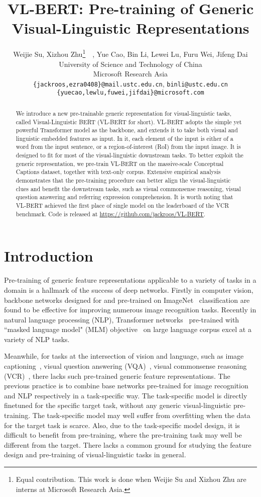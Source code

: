 \documentclass{article} \usepackage{iclr2020_conference,times}
\title{VL-BERT: Pre-training of Generic Visual-Linguistic Representations}
\author{Weijie Su, Xizhou Zhu\thanks{Equal contribution. This work is done when Weijie Su and Xizhou Zhu are interns at Microsoft Research Asia.}~~, Yue Cao, Bin Li, Lewei Lu, Furu Wei, Jifeng Dai  \\
University of Science and Technology of China
\\
Microsoft Research Asia \\
\texttt{\{jackroos,ezra0408\}@mail.ustc.edu.cn}, \texttt{binli@ustc.edu.cn} \\
\texttt{\{yuecao,lewlu,fuwei,jifdai\}@microsoft.com} \\
}
\begin{document}
\maketitle

\begin{abstract}
We introduce a new pre-trainable generic representation for visual-linguistic tasks, called Visual-Linguistic BERT (VL-BERT for short). VL-BERT adopts the simple yet powerful Transformer model as the backbone, and extends it to take both visual and linguistic embedded features as input. In it, each element of the input is either of a word from the input sentence, or a region-of-interest (RoI) from the input image. It is designed to fit for most of the visual-linguistic downstream tasks. To better exploit the generic representation, we pre-train VL-BERT on the massive-scale Conceptual Captions dataset, together with text-only corpus. Extensive empirical analysis demonstrates that the pre-training procedure can better align the visual-linguistic clues and benefit the downstream tasks, such as visual commonsense reasoning, visual question answering and referring expression comprehension. 
It is worth noting that VL-BERT achieved the first place of single model on the leaderboard of the VCR benchmark. 
Code is released at \url{https://github.com/jackroos/VL-BERT}.
\end{abstract}


\section{Introduction}
Pre-training of generic feature representations applicable to a variety of tasks in a domain is a hallmark of the success of deep networks. Firstly in computer vision, backbone networks
designed for and pre-trained on ImageNet~\citep{deng2009imagenet} classification are found to be effective for improving numerous image recognition tasks. Recently in natural language processing (NLP), Transformer networks~\citep{vaswani2017transformer} pre-trained with ``masked language model" (MLM) objective~\citep{devlin2018bert} on large language corpus excel at a variety of NLP tasks.


Meanwhile, for tasks at the intersection of vision and language, such as image captioning~\citep{young2014image,chen2015microsoft,sharma2018conceptual}, visual question answering (VQA)~\citep{antol2015vqa,johnson2017clevr,goyal2017making,hudson2019gqa}, visual commonsense reasoning (VCR)~\citep{zellers2019vcr,gao2019two}, there lacks such pre-trained generic feature representations. The previous practice is to combine base networks pre-trained for image recognition and NLP respectively in a task-specific way. The task-specific model is directly finetuned for the specific target task, without any generic visual-linguistic pre-training. The task-specific model may well suffer from overfitting when the data for the target task is scarce. Also, due to the task-specific model design, it is difficult to benefit from pre-training, where the pre-training task may well be different from the target. There lacks a common ground for studying the feature design and pre-training of visual-linguistic tasks in general.
\end{document}
